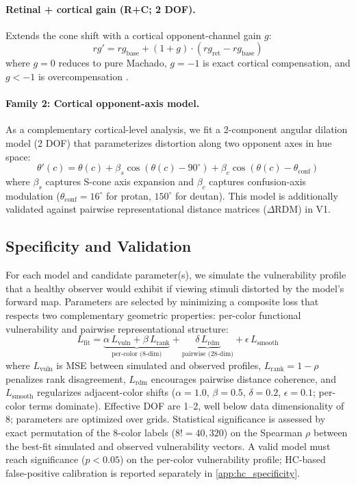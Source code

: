 \documentclass{article}
\begin{document}
\paragraph{Retinal + cortical gain (R+C; 2 DOF).}
Extends the cone shift with a cortical opponent-channel gain $g$:
\begin{equation}
rg' = rg_{\text{base}} + (1{+}g) \cdot (rg_{\text{ret}} - rg_{\text{base}})
\label{eq:rc}
\end{equation}
where $g{=}0$ reduces to pure Machado, $g{=}{-}1$ is exact cortical compensation, and $g{<}{-}1$ is overcompensation \citep{tregillus2021}.

\paragraph{Family 2: Cortical opponent-axis model.}
As a complementary cortical-level analysis, we fit a 2-component angular dilation model (2 DOF) that parameterizes distortion along two opponent axes in hue space:
\begin{equation}
\theta'(c) = \theta(c) + \beta_s \cos(\theta(c) {-} 90^\circ) + \beta_c \cos(\theta(c) {-} \theta_{\text{conf}})
\label{eq:2comp}
\end{equation}
where $\beta_s$ captures S-cone axis expansion and $\beta_c$ captures confusion-axis modulation ($\theta_{\text{conf}} = 16^\circ$ for protan, $150^\circ$ for deutan).
This model is additionally validated against pairwise representational distance matrices ($\Delta$RDM) in V1.

\subsection{Specificity and Validation}

For each model and candidate parameter(s), we simulate the vulnerability profile that a healthy observer would exhibit if viewing stimuli distorted by the model's forward map.
Parameters are selected by minimizing a composite loss that respects two complementary geometric properties: per-color functional vulnerability and pairwise representational structure:
\begin{equation}
L_{\text{fit}} = \underbrace{\alpha \, L_{\text{vuln}} + \beta \, L_{\text{rank}}}_{\text{per-color (8-dim)}} + \underbrace{\delta \, L_{\text{rdm}}}_{\text{pairwise (28-dim)}} + \epsilon \, L_{\text{smooth}}
\label{eq:loss}
\end{equation}
where $L_{\text{vuln}}$ is MSE between simulated and observed profiles, $L_{\text{rank}} = 1 - \rho$ penalizes rank disagreement, $L_{\text{rdm}}$ encourages pairwise distance coherence, and $L_{\text{smooth}}$ regularizes adjacent-color shifts ($\alpha{=}1.0$, $\beta{=}0.5$, $\delta{=}0.2$, $\epsilon{=}0.1$; per-color terms dominate).
Effective DOF are 1--2, well below data dimensionality of 8; parameters are optimized over grids.
Statistical significance is assessed by exact permutation of the 8-color labels ($8! = 40{,}320$) on the Spearman $\rho$ between the best-fit simulated and observed vulnerability vectors.
A valid model must reach significance ($p < 0.05$) on the per-color vulnerability profile; HC-based false-positive calibration is reported separately in \cref{app:hc_specificity}.
\end{document}
